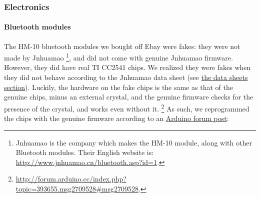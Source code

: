 \documentclass[]{article}
\let\oldparagraph\paragraph
\renewcommand{\paragraph}[1]{\oldparagraph{#1}\mbox{}}
\begin{document}
\hypertarget{electronics}{%
\subsubsection{Electronics}\label{electronics}}

\hypertarget{bluetooth-modules}{%
\paragraph{Bluetooth modules}\label{bluetooth-modules}}

The HM-10 bluetooth modules we bought off Ebay were fakes: they were not
made by Jnhuamao \footnote{Jnhuamao is the company which makes the HM-10
  module, along with other Bluetooth modules. Their English website is:
  \url{http://www.jnhuamao.cn/bluetooth.asp?id=1}.}, and did not come
with genuine Jnhuamao firmware. However, they did have real TI CC2541
chips. We realized they were fakes when they did not behave according to
the Jnhuamao data sheet (see \protect\hyperlink{data-sheets}{the data
sheets section}). Luckily, the hardware on the fake chips is the same as
that of the genuine chips, minus an external crystal, and the genuine
firmware checks for the presence of the crystal, and works even without
it. \footnote{\url{http://forum.arduino.cc/index.php?topic=393655.msg2709528\#msg2709528}.}
As such, we reprogrammed the chips with the genuine firmware according
to an
\href{http://forum.arduino.cc/index.php?topic=393655.msg2709528\#msg2709528}{Arduino
forum post}:
\end{document}
